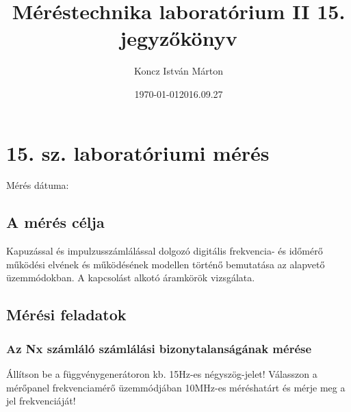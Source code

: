 \documentclass[10pt,a4paper]{article}
\begin{document}
\title{Méréstechnika laboratórium II 15. jegyzőkönyv}
\author{Koncz István Márton}
\date{\today}
\maketitle
\newpage

\section{15. sz. laboratóriumi mérés}
	Mérés dátuma:\date{2016.09.27}
	\subsection{A mérés célja}
	Kapuzással és impulzusszámlálással dolgozó digitális frekvencia- és időmérő
működési elvének és működésének modellen történő bemutatása az alapvető
üzemmódokban. A kapcsolást alkotó áramkörök vizsgálata.

	\subsection{Mérési feladatok}
		\subsubsection{Az Nx számláló számlálási bizonytalanságának mérése}
		Állítson be a függvénygenerátoron kb. 15Hz-es négyszög-jelet! Válasszon a
mérőpanel frekvenciamérő üzemmódjában 10MHz-es méréshatárt és mérje
meg a jel frekvenciáját!
		$$$$ $$$$ $$$$ $$$$ $$$$ $$$$
\end{document}
